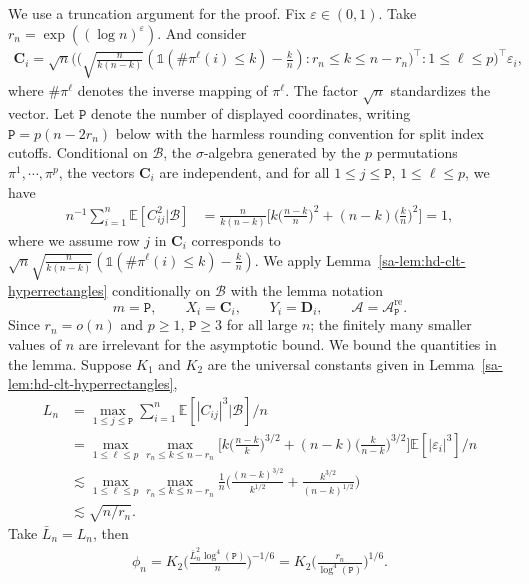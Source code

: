 \documentclass[10pt]{article}
\def\bC{\mathbf{C}}
\def\bD{\mathbf{D}}
\def\bD{\boldsymbol{D}}
\def\E{\mathbb{E}}
\def\ttp{\mathtt{P}}
\newcommand{\Indicator}{\mathds{1}}
\theoremstyle{definition}
\theoremstyle{remark}
\begin{document}
We use a truncation argument for the proof. Fix $\varepsilon \in (0,1)$. Take $r_n = \exp((\log n)^{\varepsilon})$. And consider
\begin{align*}
    \bC_i = \sqrt{n}\Big(\Big(\sqrt{\frac{n}{k(n-k)}} (\Indicator(\#\pi^{\ell}(i) \leq k) - \frac{k}{n}): r_n \leq k \leq n - r_n\Big)^\top: 1 \leq \ell \leq p\Big)^\top \varepsilon_i,
\end{align*}
where $\# \pi^{\ell}$ denotes the inverse mapping of $\pi^{\ell}$. The factor $\sqrt{n}$ standardizes the vector. Let $\ttp$ denote the number of displayed coordinates, writing $\ttp=p(n-2r_n)$ below with the harmless rounding convention for split index cutoffs. Conditional on $\mathscr{B}$, the $\sigma$-algebra generated by the $p$ permutations $\pi^1, \cdots, \pi^p$, the vectors $\bC_i$ are independent, and for all $1 \leq j \leq \ttp$, $1 \leq \ell \leq p$, we have
\begin{align*}
    n^{-1}\sum_{i = 1}^n \E[C_{ij}^2|\mathscr{B}] 
    & =  \frac{n}{k (n - k)} \bigg[k \Big(\frac{n - k}{n}\Big)^2 + (n - k) \Big(\frac{k}{n}\Big)^2 \bigg] = 1,
\end{align*}
where we assume row $j$ in $\bC_i$ corresponds to $\sqrt{n} \sqrt{\frac{n}{k(n-k)}} (\Indicator(\#\pi^{\ell}(i) \leq k) - \frac{k}{n})$. 
We apply Lemma~\ref{sa-lem:hd-clt-hyperrectangles} conditionally on $\mathscr{B}$ with the lemma notation
\[
    m=\ttp,\qquad X_i=\bC_i,\qquad Y_i=\bD_i,\qquad \mathcal A=\mathcal A_{\ttp}^{\mathrm{re}}.
\]
Since $r_n=o(n)$ and $p\geq1$, $\ttp\geq3$ for all large $n$; the finitely many smaller values of $n$ are irrelevant for the asymptotic bound. We bound the quantities in the lemma. Suppose $K_1$ and $K_2$ are the universal constants given in Lemma~\ref{sa-lem:hd-clt-hyperrectangles},
\begin{align}\label{eq:third moment coupling}
    \nonumber L_n & = \max_{1 \leq j \leq \ttp} \sum_{i = 1}^n \E[|C_{ij}|^3|\mathscr{B}]/n \\
    \nonumber & = \max_{1 \leq \ell \leq p} \max_{r_n \leq k \leq n - r_n}
    \bigg[k \Big(\frac{n-k}{k}\Big)^{3/2}
    +(n-k)\Big(\frac{k}{n-k}\Big)^{3/2}\bigg]\E[|\varepsilon_i|^3]/n \\
    \nonumber & \lesssim \max_{1 \leq \ell \leq p} \max_{r_n \leq k \leq n - r_n}
    \frac{1}{n}\bigg(\frac{(n-k)^{3/2}}{k^{1/2}}+\frac{k^{3/2}}{(n-k)^{1/2}}\bigg)  \\
    & \lesssim \sqrt{n/r_n}.
\end{align}
Take $\bar{L}_n = L_n$, then
\begin{align*}
    \phi_n = K_2 \bigg(\frac{\bar{L}_n^2 \log^4(\ttp)}{n}\bigg)^{-1/6}
    = K_2 \bigg(\frac{r_n}{\log^4(\ttp)}\bigg)^{1/6}.
\end{align*} 
\end{document}
